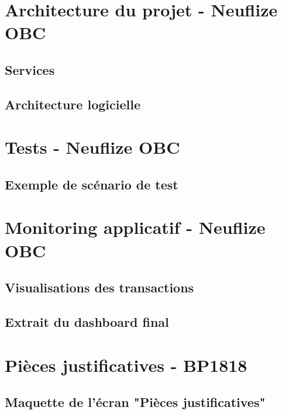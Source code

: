 \documentclass[11pt,twoside]{scrreprt}
\begin{document}
\begin{appendices}

	\chapter{Architecture du projet - Neuflize OBC}
	
		\section{Services}
		\label{a1}
		
	
		\section{Architecture logicielle}
		\label{a2}
		
	
	\chapter{Tests - Neuflize OBC}
		\section{Exemple de scénario de test}
		\label{b1}
		

	\chapter{Monitoring applicatif - Neuflize OBC}
		\section{Visualisations des transactions}
		\label{c1}
		
		\section{Extrait du dashboard final}
		\label{c2}
		
		
	\chapter{Pièces justificatives - BP1818}
		\section{Maquette de l'écran "Pièces justificatives"}
		\label{d1}
		
\end{appendices}
\newpage
\newpage
\end{document}
